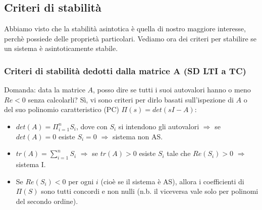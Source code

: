 \subsection{Criteri di stabilità}
Abbiamo visto che la stabilità asintotica è quella di nostro maggiore interesse, perchè possiede delle proprietà particolari. Vediamo ora dei criteri per stabilire se un sistema è asintoticamente stabile.
\subsubsection{Criteri di stabilità dedotti dalla matrice A (SD LTI a TC)}
Domanda: data la matrice $A$, posso dire se tutti i suoi autovalori hanno o meno $Re <0$ senza calcolarli?\newline
\newline
Sì, vi sono criteri per dirlo basati sull'ispezione di $A$ o del suo polinomio caratteristico (PC) $\Pi(s) = det (sI-A)$:
\begin{itemize}
    \item $det(A) = \Pi_{i=1}^{n}S_i$, dove con $S_i$ si intendono gli autovalori $\Longrightarrow$ se $det(A) = 0$ esiste $S_i = 0$ $\Longrightarrow$ sistema non AS.
    \item $tr(A) = \sum_{i=1}^{n}S_i$ $\Longrightarrow$ se $tr(A) >0$ esiste $S_i$ tale che $Re(S_i) > 0$ $\Longrightarrow$ sistema I.
    \item Se $Re(S_i)<0$ per ogni $i$ (cioè se il sistema è AS), allora i coefficienti di $\Pi(S)$ sono tutti concordi e non nulli (n.b. il viceversa vale solo per polinomi del secondo ordine).
\end{itemize}